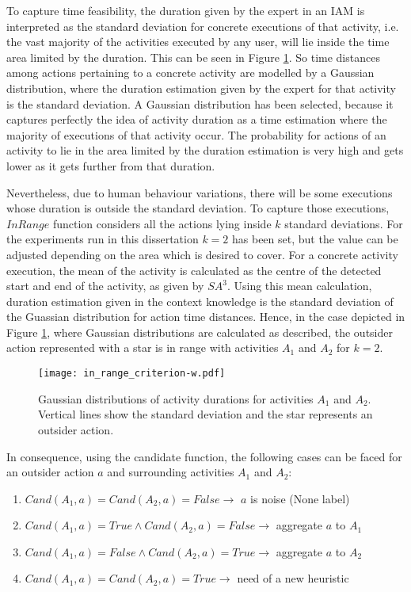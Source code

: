 To capture time feasibility, the duration given by the expert in an IAM is interpreted as the standard deviation for concrete executions of that activity, i.e. the vast majority of the activities executed by any user, will lie inside the time area limited by the duration. This can be seen in Figure \ref{fig-in-range}. So time distances among actions pertaining to a concrete activity are modelled by a Gaussian distribution, where the duration estimation given by the expert for that activity is the standard deviation. A Gaussian distribution has been selected, because it captures perfectly the idea of activity duration as a time estimation where the majority of executions of that activity occur. The probability for actions of an activity to lie in the area limited by the duration estimation is very high and gets lower as it gets further from that duration.

Nevertheless, due to human behaviour variations, there will be some executions whose duration is outside the standard deviation. To capture those executions, $InRange$ function considers all the actions lying inside $k$ standard deviations. For the experiments run in this dissertation $k=2$ has been set, but the value can be adjusted depending on the area which is desired to cover. For a concrete activity execution, the mean of the activity is calculated as the centre of the detected start and end of the activity, as given by $SA^3$. Using this mean calculation, duration estimation given in the context knowledge is the standard deviation of the Guassian distribution for action time distances. Hence, in the case depicted in Figure \ref{fig-in-range}, where Gaussian distributions are calculated as described, the outsider action represented with a star is in range with activities $A_1$ and $A_2$ for $k=2$.

\begin{figure}[htbp]%
\centering
\texttt{[image: in\_range\_criterion-w.pdf]}
    \caption{Gaussian distributions of activity durations for activities $A_1$ and $A_2$. Vertical lines show the standard deviation and the star represents an outsider action.}
    \label{fig-in-range}
\end{figure}

In consequence, using the candidate function, the following cases can be faced for an outsider action $a$ and surrounding activities $A_1$ and $A_2$:

\begin{enumerate}
 \item $Cand(A_1, a) = Cand(A_2, a) = False \rightarrow$ $a$ is noise (None label)
 \item $Cand(A_1, a) = True \wedge Cand(A_2, a) = False \rightarrow$ aggregate $a$ to $A_1$
 \item $Cand(A_1, a) = False \wedge Cand(A_2, a) = True \rightarrow$ aggregate $a$ to $A_2$
 \item $Cand(A_1, a) = Cand(A_2, a) = True \rightarrow$ need of a new heuristic
\end{enumerate}

